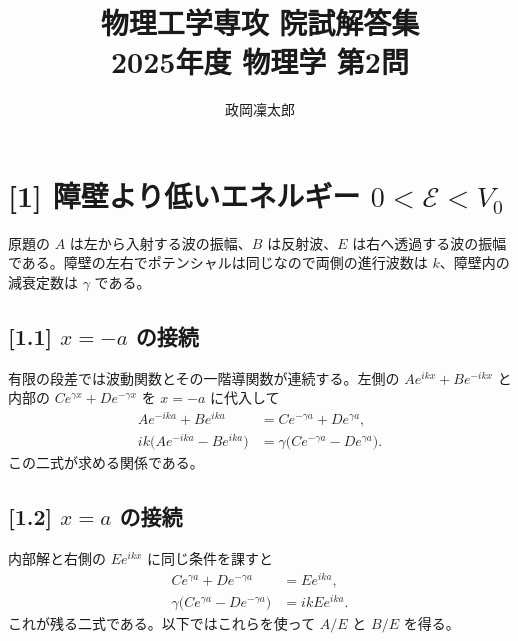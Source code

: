 \documentclass[11pt,a4paper]{article}
\title{物理工学専攻 院試解答集\\2025年度 物理学 第2問}
\author{政岡凜太郎}
\date{}
\begin{document}
\maketitle

\section*{[1] 障壁より低いエネルギー $0<\mathcal E<V_0$}
原題の $A$ は左から入射する波の振幅、$B$ は反射波、$E$ は右へ透過する波の振幅である。障壁の左右でポテンシャルは同じなので両側の進行波数は $k$、障壁内の減衰定数は $\gamma$ である。

\subsection*{[1.1] $x=-a$ の接続}
有限の段差では波動関数とその一階導関数が連続する。左側の $Ae^{ikx}+Be^{-ikx}$ と内部の $Ce^{\gamma x}+De^{-\gamma x}$ を $x=-a$ に代入して
\begin{align}
 Ae^{-ika}+Be^{ika}&=Ce^{-\gamma a}+De^{\gamma a},\label{eq:left-psi}\\
 ik\bigl(Ae^{-ika}-Be^{ika}\bigr)&=\gamma\bigl(Ce^{-\gamma a}-De^{\gamma a}\bigr).\label{eq:left-der}
\end{align}
この二式が求める関係である。

\subsection*{[1.2] $x=a$ の接続}
内部解と右側の $Ee^{ikx}$ に同じ条件を課すと
\begin{align}
 Ce^{\gamma a}+De^{-\gamma a}&=Ee^{ika},\label{eq:right-psi}\\
 \gamma\bigl(Ce^{\gamma a}-De^{-\gamma a}\bigr)&=ikEe^{ika}.\label{eq:right-der}
\end{align}
これが残る二式である。以下ではこれらを使って $A/E$ と $B/E$ を得る。
\end{document}

